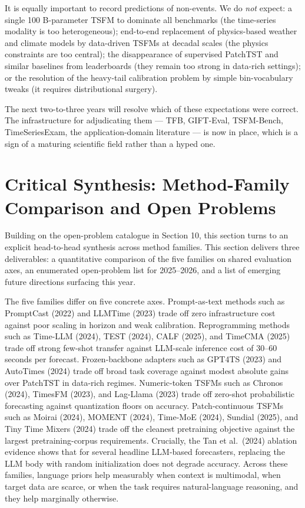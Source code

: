 It is equally important to record predictions of non-events. We do \emph{not} expect: a single 100 B-parameter TSFM to dominate all benchmarks (the time-series modality is too heterogeneous); end-to-end replacement of physics-based weather and climate models by data-driven TSFMs at decadal scales (the physics constraints are too central); the disappearance of supervised PatchTST and similar baselines from leaderboards (they remain too strong in data-rich settings); or the resolution of the heavy-tail calibration problem by simple bin-vocabulary tweaks (it requires distributional surgery).

The next two-to-three years will resolve which of these expectations were correct. The infrastructure for adjudicating them --- TFB, GIFT-Eval, TSFM-Bench, TimeSeriesExam, the application-domain literature --- is now in place, which is a sign of a maturing scientific field rather than a hyped one.

\section{Critical Synthesis: Method-Family Comparison and Open Problems}\label{critical-synthesis-method-family-comparison-and-open-problems}

Building on the open-problem catalogue in Section 10, this section turns to an explicit head-to-head synthesis across method families. This section delivers three deliverables: a quantitative comparison of the five families on shared evaluation axes, an enumerated open-problem list for 2025--2026, and a list of emerging future directions surfacing this year.

The five families differ on five concrete axes. Prompt-as-text methods such as PromptCast (2022) and LLMTime (2023) trade off zero infrastructure cost against poor scaling in horizon and weak calibration. Reprogramming methods such as Time-LLM (2024), TEST (2024), CALF (2025), and TimeCMA (2025) trade off strong few-shot transfer against LLM-scale inference cost of 30--60 seconds per forecast. Frozen-backbone adapters such as GPT4TS (2023) and AutoTimes (2024) trade off broad task coverage against modest absolute gains over PatchTST in data-rich regimes. Numeric-token TSFMs such as Chronos (2024), TimesFM (2023), and Lag-Llama (2023) trade off zero-shot probabilistic forecasting against quantization floors on accuracy. Patch-continuous TSFMs such as Moirai (2024), MOMENT (2024), Time-MoE (2024), Sundial (2025), and Tiny Time Mixers (2024) trade off the cleanest pretraining objective against the largest pretraining-corpus requirements. Crucially, the Tan et al.~(2024) ablation evidence shows that for several headline LLM-based forecasters, replacing the LLM body with random initialization does not degrade accuracy. Across these families, language priors help measurably when context is multimodal, when target data are scarce, or when the task requires natural-language reasoning, and they help marginally otherwise.

